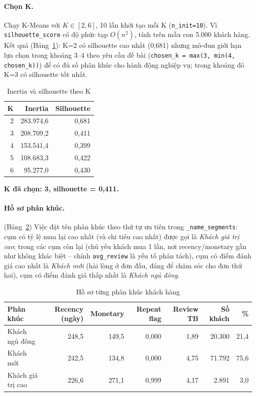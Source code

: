 \documentclass[12pt,a4paper]{article}
\newcommand{\code}[1]{\texttt{\small #1}}
\begin{document}
\paragraph{Chọn K.} Chạy K-Means với \(K \in [2,6]\), 10 lần khởi tạo mỗi K (\code{n\_init=10}). Vì
\code{silhouette\_score} có độ phức tạp \(O(n^2)\), tính trên mẫu con 5.000 khách hàng. Kết quả (Bảng~\ref{tab:elbow}):
K=2 có silhouette cao nhất (0,681) nhưng mô-đun giới hạn lựa chọn trong khoảng 3--4 theo yêu cầu đề bài
(\code{chosen\_k = max(3, min(4, chosen\_k))}) để có đủ số phân khúc cho hành động nghiệp vụ; trong khoảng đó
K=3 có silhouette tốt nhất.

\begin{table}[h]
\centering
\caption{Inertia và silhouette theo K}\label{tab:elbow}
\small
\begin{tabular}{@{}r r r@{}}
\toprule
\textbf{K} & \textbf{Inertia} & \textbf{Silhouette}\\
\midrule
2 & 283.974,6 & 0,681\\
3 & 208.709,2 & 0,411\\
4 & 153.541,4 & 0,399\\
5 & 108.683,3 & 0,422\\
6 & 95.277,0 & 0,430\\
\bottomrule
\end{tabular}
\end{table}

\textbf{K đã chọn: 3, silhouette = 0,411.}

\paragraph{Hồ sơ phân khúc.} (Bảng~\ref{tab:segments}) Việc đặt tên phân khúc theo thứ tự ưu tiên trong
\code{\_name\_segments}: cụm có tỷ lệ mua lại cao nhất (và chi tiêu cao nhất) được gọi là \emph{Khách giá trị
cao}; trong các cụm còn lại (chủ yếu khách mua 1 lần, nơi recency/monetary gần như không khác biệt -- chính
\code{avg\_review} là yếu tố phân tách), cụm có điểm đánh giá cao nhất là \emph{Khách mới} (hài lòng ở đơn đầu,
đáng để chăm sóc cho đơn thứ hai), cụm có điểm đánh giá thấp nhất là \emph{Khách ngủ đông}.

\begin{table}[h]
\centering
\caption{Hồ sơ từng phân khúc khách hàng}\label{tab:segments}
\small
\begin{tabular}{@{}l r r r r r r@{}}
\toprule
\textbf{Phân khúc} & \textbf{Recency (ngày)} & \textbf{Monetary} & \textbf{Repeat flag} & \textbf{Review TB} & \textbf{Số khách} & \textbf{\%}\\
\midrule
Khách ngủ đông & 248,5 & 149,5 & 0,000 & 1,89 & 20.300 & 21,4\\
Khách mới & 242,5 & 134,8 & 0,000 & 4,75 & 71.792 & 75,6\\
Khách giá trị cao & 226,6 & 271,1 & 0,999 & 4,17 & 2.891 & 3,0\\
\bottomrule
\end{tabular}
\end{table}
\end{document}
